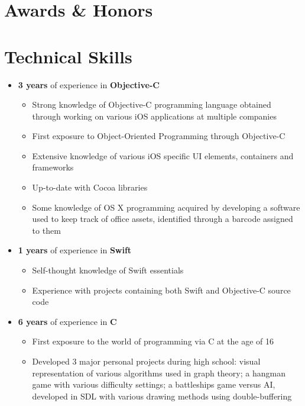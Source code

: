\documentclass[11pt, a4paper, sans]{moderncv}
\begin{document}
\section{Awards \& Honors}

\section{Technical Skills}
\begin{itemize}
\item {\textbf{3 years} of experience in \textbf{Objective-C}}
	{\begin{itemize}
			\item Strong knowledge of Objective-C programming language obtained through working on various iOS applications at multiple companies
			\item First exposure to Object-Oriented Programming through Objective-C
			\item Extensive knowledge of various iOS specific UI elements, containers and frameworks
			\item Up-to-date with Cocoa libraries
			\item Some knowledge of OS X programming acquired by developing a software used to keep track of office assets, identified through a barcode assigned to them
	\end{itemize}}	
\item {\textbf{1 years} of experience in \textbf{Swift}}
	{\begin{itemize}
			\item Self-thought knowledge of Swift essentials
			\item Experience with projects containing both Swift and Objective-C source code
	\end{itemize}}
\item {\textbf{6 years} of experience in \textbf{C}}
	{\begin{itemize}
		\item First exposure to the world of programming via C at the age of 16
		\item Developed 3 major personal projects during high school: visual representation of various algorithms used in graph theory; a hangman game with various difficulty settings; a battleships game versus AI, developed in SDL with various drawing methods using double-buffering 

\end{itemize}}
\end{itemize}
\end{document}
